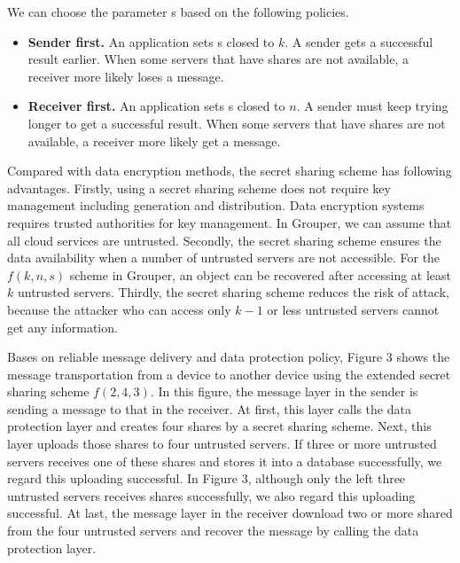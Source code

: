 \documentclass[twocolumn,10pt]{article}
\begin{document}
We can choose the parameter s based on the following policies.

\begin{itemize}
	\setlength{\itemsep}{1pt}
	\setlength{\parskip}{0pt}
	\setlength{\parsep}{0pt}
	\item \textbf{Sender first.} 
	An application sets s closed to $k$. 
	A sender gets a successful result earlier.
	When some servers that have shares are not available, a receiver more likely loses a message.
	\item \textbf{Receiver first.}
	An application sets s closed to $n$. 
	A sender must keep trying longer to get a successful result.
	When some servers that have shares are not available, a receiver more likely get a message.
\end{itemize}

Compared with data encryption methods, the secret sharing scheme has following advantages.
Firstly, using a secret sharing scheme does not require key management including generation and distribution.
Data encryption systems requires trusted authorities for key management.
In Grouper, we can assume that all cloud services are untrusted.
Secondly, the secret sharing scheme ensures the data availability when a number of untrusted servers are not accessible.
For the $f(k, n, s)$ scheme in Grouper, an object can be recovered after accessing at least $k$ untrusted servers.
Thirdly, the secret sharing scheme reduces the risk of attack, because the attacker who can access only $k-1$ or less untrusted servers cannot get any information.

Bases on reliable message delivery and data protection policy, Figure 3 shows the message transportation from a device to another device using the extended secret sharing scheme $f(2, 4, 3)$.
In this figure, the message layer in the sender is sending a message to that in the receiver.
At first, this layer calls the data protection layer and creates four shares by a secret sharing scheme.
Next, this layer uploads those shares to four untrusted servers.
If three or more untrusted servers receives one of these shares and stores it into a database successfully, we regard this uploading successful.
In Figure 3, although only the left three untrusted servers receives shares successfully, we also regard this uploading successful.
At last, the message layer in the receiver download two or more shared from the four untrusted servers and recover the message by calling the data protection layer.
\end{document}
